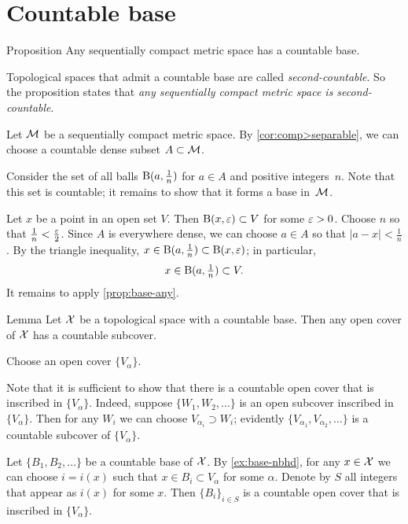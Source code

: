 \section{Countable base}

\begin{thm}{Proposition}\label{cor:comp>2count}
Any sequentially compact metric space has a countable base.
\end{thm}

Topological spaces that admit a countable base are called \emph{second-countable}.
So the proposition states that \textit{any sequentially compact metric space is second-countable}.

Let $\mathcal{M}$ be a sequentially compact metric space.
By \ref{cor:comp>separable}, we can choose a countable dense subset $A\subset\mathcal{M}$.

Consider the set of all balls $\mathrm{B}(a,\tfrac 1n)$ for $a\in A$ and positive integers~$n$.
Note that this set is countable; it remains to show that it forms a base in~$\mathcal{M}$.

Let $x$ be a point in an open set $V$.
Then $\mathrm{B}(x,\varepsilon)\subset V$ for some $\varepsilon>0$.
Choose $n$ so that $\tfrac1n<\tfrac{\varepsilon}2$.
Since $A$ is everywhere dense, we can choose $a\in A$ so that $|a-x|< \tfrac1n$.
By the triangle inequality, $x\in \mathrm{B}(a,\tfrac1n)\subset \mathrm{B}(x,\varepsilon)$;
in particular,
\[x\in \mathrm{B}(a,\tfrac1n)\subset V.\]
It remains to apply \ref{prop:base-any}.
\qeds

\begin{thm}{Lemma}\label{lem:lind}
Let $\mathcal{X}$ be a topological space with a countable base.
Then any open cover of $\mathcal{X}$ has a countable subcover.
\end{thm}

Choose an open cover $\{V_\alpha\}$.

Note that it is sufficient to show that there is a countable open cover that is inscribed in  $\{V_\alpha\}$.
Indeed, suppose $\{W_1,W_2,\dots\}$ is an open subcover inscribed in $\{V_\alpha\}$.
Then for any $W_i$ we can choose $V_{\alpha_i}\supset W_i$;
evidently $\{V_{\alpha_1},V_{\alpha_2},\dots\}$ is a countable subcover of $\{V_\alpha\}$.

Let $\{B_1,B_2,\dots\}$ be a countable base of $\mathcal{X}$.
By \ref{ex:base-nbhd}, for any $x\in\mathcal{X}$ we can choose $i=i(x)$ such that $x\in B_i\subset V_\alpha$ for some $\alpha$.
Denote by $S$ all integers that appear as $i(x)$ for some $x$.
Then $\{B_i\}_{i\in S}$ is a countable open cover that is inscribed in $\{V_\alpha\}$.
\qeds

